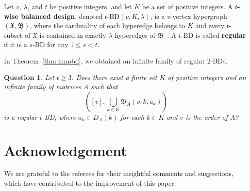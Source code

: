 \documentclass[11pt]{article}
\newtheorem{question}[theorem]{Question}
\begin{document}

Let $v$, $\lambda$, and $t$ be positive integers, and let $K$ be a set of positive integers.  
A \textbf{$t$-wise balanced design}, denoted $t$-BD$(v,K,\lambda)$, is a $v$-vertex hypergraph $(\mathfrak X,\mathfrak B)$, where the cardinality of each hyperedge belongs to $K$ and every $t$-subset of $\mathfrak X$ is contained in exactly $\lambda$ hyperedges of $\mathfrak B$~\cite{KK}. 
A $t$-BD is called \textbf{regular} if it is a $s$-BD for any $1\leqslant s<t$. 

In Theorem~\ref{thm:hmpbd}, we obtained an infinite family of regular $2$-BDs.


\begin{question}
Let $t\geqslant 3$.
Does there exist a finite set $K$ of positive integers and an infinite family of matrices $A$ such that 
\[
\left ([v],\bigcup_{k\in K}\mathfrak B_A(v,k,a_k) \right )
\]
is a regular $t$-BD,   
where $a_k\in D_A(k)$ for each $k \in K$ and $v$ is the order of $A$?
\end{question}


\section{Acknowledgement}

We are grateful to the referees for their insightful comments and suggestions, which have contributed to the improvement of this paper.
\end{document}
